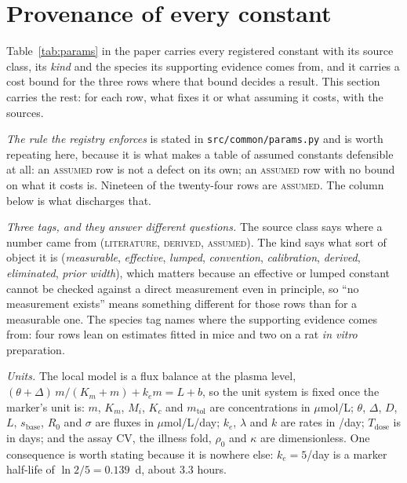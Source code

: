 \section{Provenance of every constant}
\label{sec:provenance}

Table~\ref{tab:params} in the paper carries every registered constant with its source
class, its \emph{kind} and the species its supporting evidence comes from, and it carries
a cost bound for the three rows where that bound decides a result. This section carries
the rest: for each row, what fixes it or what assuming it costs, with the sources.

\emph{The rule the registry enforces} is stated in \texttt{src/common/params.py} and is
worth repeating here, because it is what makes a table of assumed constants defensible at
all: an \textsc{assumed} row is not a defect on its own; an \textsc{assumed} row with no
bound on what it costs is. Nineteen of the twenty-four rows are \textsc{assumed}. The
column below is what discharges that.

\emph{Three tags, and they answer different questions.} The source class says where a
number came from (\textsc{literature}, \textsc{derived}, \textsc{assumed}). The kind says
what sort of object it is (\emph{measurable}, \emph{effective}, \emph{lumped},
\emph{convention}, \emph{calibration}, \emph{derived}, \emph{eliminated}, \emph{prior
width}), which matters because an effective or lumped constant cannot be checked against a
direct measurement even in principle, so ``no measurement exists'' means something
different for those rows than for a measurable one. The species tag names where the
supporting evidence comes from: four rows lean on estimates fitted in mice and two on a
rat \emph{in vitro} preparation.

\emph{Units.} The local model is a flux balance at the plasma level,
$(\theta + \Delta)\,m/(K_m + m) + k_e m = L + b$, so the unit system is fixed once the
marker's unit is: $m$, $K_m$, $M_i$, $K_c$ and $m_{\mathrm{tol}}$ are concentrations in
$\mu$mol/L; $\theta$, $\Delta$, $D$, $L$, $s_{\mathrm{base}}$, $R_0$ and $\sigma$ are
fluxes in $\mu$mol/L/day; $k_e$, $\lambda$ and $k$ are rates in /day; $T_{\mathrm{dose}}$
is in days; and the assay CV, the illness fold, $\rho_0$ and $\kappa$ are dimensionless.
One consequence is worth stating because it is nowhere else: $k_e = 5$/day is a marker
half-life of $\ln 2/5 = 0.139$~d, about $3.3$ hours.

